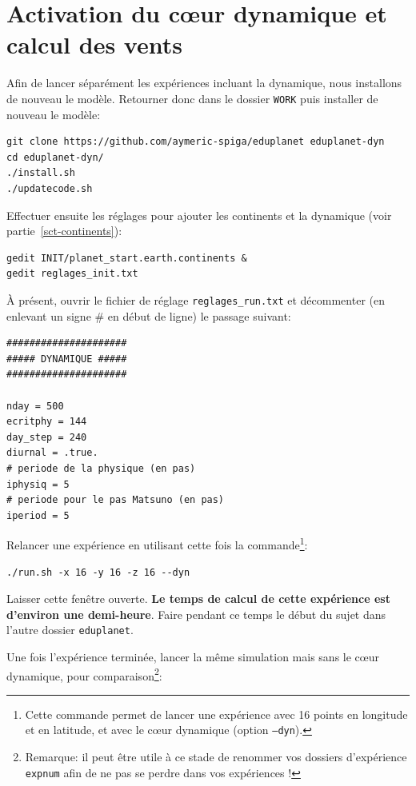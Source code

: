 \documentclass[a4paper,12pt]{article}
\begin{document}
\section{Activation du c\oe ur dynamique et calcul des vents}

Afin de lancer séparément les expériences incluant la dynamique, nous
installons de nouveau le modèle. Retourner donc dans le dossier \texttt{WORK}
puis installer de nouveau le modèle:

\begin{verbatim}
git clone https://github.com/aymeric-spiga/eduplanet eduplanet-dyn
cd eduplanet-dyn/
./install.sh
./updatecode.sh
\end{verbatim}

Effectuer ensuite les réglages pour ajouter les continents et la dynamique
(voir partie~\ref{sct-continents}):

\begin{verbatim}
gedit INIT/planet_start.earth.continents &
gedit reglages_init.txt
\end{verbatim}

\`A présent, ouvrir le fichier de réglage \texttt{reglages\_run.txt} et
décommenter (en enlevant un signe \# en début de ligne) le passage suivant:

\begin{verbatim}
#####################
##### DYNAMIQUE #####
#####################

nday = 500
ecritphy = 144
day_step = 240
diurnal = .true.
# periode de la physique (en pas)
iphysiq = 5
# periode pour le pas Matsuno (en pas)
iperiod = 5
\end{verbatim}

Relancer une expérience en utilisant cette fois la commande\footnote{Cette
commande permet de lancer une expérience avec 16 points en longitude et en
latitude, et avec le c\oe ur dynamique (option \texttt{--dyn}).}:

\begin{verbatim}
./run.sh -x 16 -y 16 -z 16 --dyn
\end{verbatim}

Laisser cette fenêtre ouverte. \textbf{Le temps de calcul de cette expérience
est d'environ une demi-heure}. Faire pendant ce temps le début du sujet dans
l'autre dossier \texttt{eduplanet}.

Une fois l'expérience terminée, lancer la même simulation mais sans le c\oe ur
dynamique, pour comparaison\footnote{Remarque: il peut être utile à ce stade de
renommer vos dossiers d'expérience \texttt{expnum} afin de ne pas se perdre
dans vos expériences !}:
\end{document}
